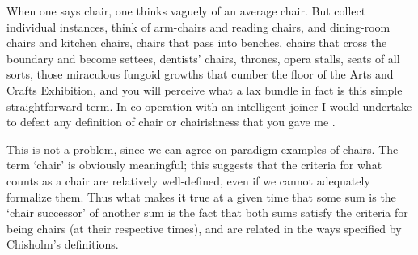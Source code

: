 \documentclass[11pt]{article}
\newenvironment{squote}{%
\begin{spacing}{1}
\begin{list}{}{%
\setlength{\labelwidth}{0pt}%
\rightmargin\leftmargin%
}
\item\relax
}{%
\end{list}%
\end{spacing}
}
\begin{document}
\begin{spacing}{1.5}
\begin{squote}
When one says chair, one thinks vaguely of an average chair.  But
collect individual instances, think of arm-chairs and reading chairs,
and dining-room chairs and kitchen chairs, chairs that pass into
benches, chairs that cross the boundary and become settees, dentists'
chairs, thrones, opera stalls, seats of all sorts, those miraculous
fungoid growths that cumber the floor of the Arts and Crafts
Exhibition, and you will perceive what a lax bundle in fact is this
simple straightforward term.  In co-operation with an intelligent
joiner I would undertake to defeat any definition of chair or
chairishness that you gave me \citep[384--385]{wells1904}.
\end{squote}
This is not a problem, since we can agree on paradigm examples of
chairs.  The term `chair' is obviously meaningful; this suggests that
the criteria for what counts as a chair are relatively well-defined,
even if we cannot adequately formalize them.  Thus what makes it true
at a given time that some sum is the `chair successor' of another sum
is the fact that both sums satisfy the criteria for being chairs (at
their respective times), and are related in the ways specified by
Chisholm's definitions.





\end{spacing}
\end{document}
